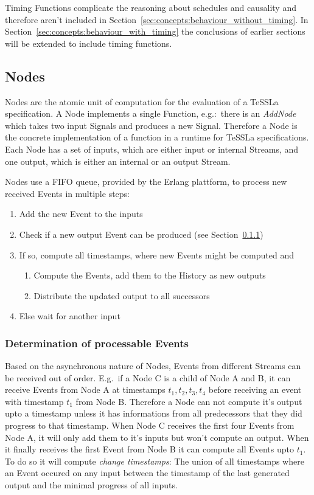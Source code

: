 Timing Functions complicate the reasoning about schedules and causality and therefore aren't included in Section~\ref{sec:concepts:behaviour_without_timing}.
In Section~\ref{sec:concepts:behaviour_with_timing} the conclusions of earlier sections will be extended to include timing functions.


\subsection{Nodes}
\label{sec:concepts:defs:nodes}

Nodes are the atomic unit of computation for the evaluation of a TeSSLa specification.
A Node implements a single Function, e.g.:\ there is an \emph{AddNode} which takes two input Signals and produces a new Signal.
Therefore a Node is the concrete implementation of a function in a runtime for TeSSLa specifications.
Each Node has a set of inputs, which are either input or internal Streams, and one output, which is either an internal or an output Stream.


Nodes use a FIFO queue, provided by the Erlang plattform, to process new received Events in multiple steps:

\begin{enumerate}
  \item Add the new Event to the inputs
  \item Check if a new output Event can be produced (see Section~\ref{sec:concepts:defs:nodes:processable})
  \item If so, compute all timestamps, where new Events might be computed and
    \begin{enumerate}
      \item Compute the Events, add them to the History as new outputs
      \item Distribute the updated output to all successors
    \end{enumerate}
  \item Else wait for another input
\end{enumerate}

\subsubsection{Determination of processable Events}
\label{sec:concepts:defs:nodes:processable}

Based on the asynchronous nature of Nodes, Events from different Streams can be received out of order.
E.g.\ if a Node C is a child of Node A and B, it can receive Events from Node A at timestamps \(t_1, t_2, t_3, t_4\)
before receiving an event with timestamp \(t_1\) from Node B.
Therefore a Node can not compute it's output upto a timestamp unless it has informations from all predecessors that they did progress to that timestamp.
When Node C receives the first four Events from Node A, it will only add them to it's inputs but won't compute an output.
When it finally receives the first Event from Node B it can compute all Events upto \(t_1\).
To do so it will compute \emph{change timestamps}: The union of all timestamps where an Event occured on any input between the timestamp of the last generated output and the minimal progress of all inputs.

